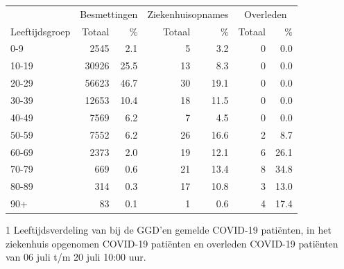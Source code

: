\documentclass[
  english,
  man,floatsintext]{apa6}
\begin{document}
\begin{table}
\centering\begingroup\fontsize{11}{13}\selectfont

\begin{threeparttable}
\begin{tabular}{lrrrrrr}
\toprule
\multicolumn{1}{c}{ } & \multicolumn{2}{c}{Besmettingen} & \multicolumn{2}{c}{Ziekenhuisopnames} & \multicolumn{2}{c}{Overleden} \\
\cmidrule(l{3pt}r{3pt}){2-3} \cmidrule(l{3pt}r{3pt}){4-5} \cmidrule(l{3pt}r{3pt}){6-7}
Leeftijdsgroep & Totaal & \% & Totaal & \% & Totaal & \%\\
\midrule
0-9 & 2545 & 2.1 & 5 & 3.2 & 0 & 0.0\\
10-19 & 30926 & 25.5 & 13 & 8.3 & 0 & 0.0\\
20-29 & 56623 & 46.7 & 30 & 19.1 & 0 & 0.0\\
30-39 & 12653 & 10.4 & 18 & 11.5 & 0 & 0.0\\
40-49 & 7569 & 6.2 & 7 & 4.5 & 0 & 0.0\\
50-59 & 7552 & 6.2 & 26 & 16.6 & 2 & 8.7\\
60-69 & 2373 & 2.0 & 19 & 12.1 & 6 & 26.1\\
70-79 & 669 & 0.6 & 21 & 13.4 & 8 & 34.8\\
80-89 & 314 & 0.3 & 17 & 10.8 & 3 & 13.0\\
90+ & 83 & 0.1 & 1 & 0.6 & 4 & 17.4\\
\bottomrule
\end{tabular}
\begin{tablenotes}
\item[1] Leeftijdsverdeling van bij de GGD’en gemelde COVID-19 patiënten, in het ziekenhuis opgenomen COVID-19 patiënten en overleden COVID-19 patiënten van 06 juli t/m 20 juli 10:00 uur.
\end{tablenotes}
\end{threeparttable}
\endgroup{}
\end{table}

\newpage
\end{document}
